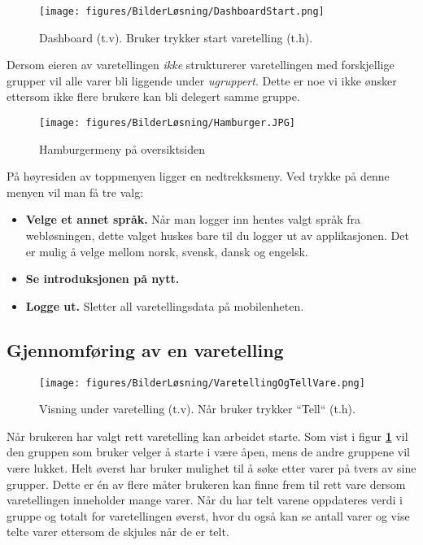 \begin{figure}[H] 
    \centering
    \texttt{[image: figures/BilderLøsning/DashboardStart.png]}
    \caption{Dashboard (t.v). Bruker trykker start varetelling (t.h).}
    \label{DashboardStart}
\end{figure}

Dersom eieren av varetellingen \textit{ikke} strukturerer varetellingen med forskjellige grupper vil alle varer bli liggende under \textit{ugruppert}. Dette er noe vi ikke ønsker ettersom ikke flere brukere kan bli delegert samme gruppe.  

\begin{figure}[H] 
    \centering
    \texttt{[image: figures/BilderLøsning/Hamburger.JPG]}
    \caption{Hamburgermeny på oversiktsiden}
\end{figure}

På høyresiden av toppmenyen ligger en nedtrekksmeny. Ved trykke på denne menyen vil man få tre valg:
\begin{itemize}
    \item \textbf{Velge et annet språk.} Når man logger inn hentes valgt språk fra webløsningen, dette valget huskes bare til du logger ut av applikasjonen. Det er mulig å velge mellom norsk, svensk, dansk og engelsk.
    \item \textbf{Se introduksjonen på nytt.}
    \item \textbf{Logge ut.} Sletter all varetellingsdata på mobilenheten.
\end{itemize} 


\subsection{\textbf{Gjennomføring av en varetelling}}

\begin{figure}[H] 
    \centering
    \texttt{[image: figures/BilderLøsning/VaretellingOgTellVare.png]}
    \caption{Visning under varetelling (t.v). Når bruker trykker ``Tell`` (t.h).}
\end{figure}

Når brukeren har valgt rett varetelling kan arbeidet starte. Som vist i figur \textbf{\ref{DashboardStart}} vil den gruppen som bruker velger å starte i være åpen, mens de andre gruppene vil være lukket. Helt øverst har bruker mulighet til å søke etter varer på tvers av sine grupper. Dette er én av flere måter brukeren kan finne frem til rett vare dersom varetellingen inneholder mange varer. Når du har telt varene oppdateres verdi i gruppe og totalt for varetellingen øverst, hvor du også kan se antall varer og vise telte varer ettersom de skjules når de er telt. 

